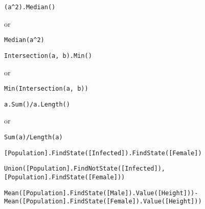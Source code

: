\documentclass[]{memoir}
\begin{document}
\lstinline!(a^2).Median()!

or

\lstinline!Median(a^2)!


\lstinline!Intersection(a, b).Min()!

or

\lstinline!Min(Intersection(a, b))!


\lstinline!a.Sum()/a.Length()!

or

\lstinline!Sum(a)/Length(a)!


\lstinline![Population].FindState([Infected]).FindState([Female])!


\lstinline!Union([Population].FindNotState([Infected]), [Population].FindState([Female]))!


\lstinline!Mean([Population].FindState([Male]).Value([Height]))-Mean([Population].FindState([Female]).Value([Height]))!

\end{document}
